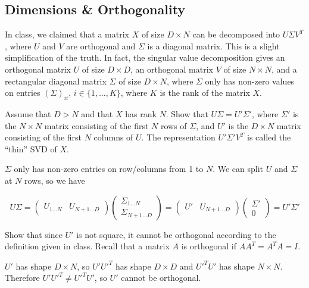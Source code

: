 \subsection{Dimensions \& Orthogonality} In class, we claimed that a matrix $X$ of size $D \times N$ can be decomposed into $U\Sigma V^T$, where $U$ and $V$ are orthogonal and $\Sigma$ is a diagonal matrix. This is a slight simplification of the truth. In fact, the singular value decomposition gives an orthogonal matrix $U$ of size $D \times D$, an orthogonal matrix $V$ of size $N \times N$, and a rectangular diagonal matrix $\Sigma$ of size $D \times N$, where $\Sigma$ only has non-zero values on entries $(\Sigma)_{ii}$, $i \in \{1, \ldots, K\}$, where $K$ is the rank of the matrix $X$. 

\problem[3]Assume that $D > N$ and that $X$ has rank $N$. Show that $U\Sigma = U'\Sigma'$, where $\Sigma'$ is the $N \times N$ matrix consisting of the first $N$ rows of $\Sigma$, and $U'$ is the $D \times N$ matrix consisting of the first $N$ columns of $U$. The representation $U'\Sigma' V^T$ is called the ``thin'' SVD of $X$.

\begin{solution}
	$\Sigma$ only has non-zero entries on row/columns from 1 to $N$.
	We can split $U$ and $\Sigma$ at $N$ rows, so we have

	$$
	U \Sigma = 
	\begin{pmatrix}
		U_{1 \dots N} & U_{N+1 \dots D}
	\end{pmatrix}
	\begin{pmatrix}
		\Sigma_{1 \dots N} \\
		\Sigma_{N+1 \dots D}
	\end{pmatrix} =
	\begin{pmatrix}
		U' & U_{N+1 \dots D}
	\end{pmatrix}
	\begin{pmatrix}
		\Sigma' \\
		0
	\end{pmatrix} =
	U' \Sigma'
	$$
\end{solution}

\problem[3] Show that since $U'$ is not square, it cannot be orthogonal according to the definition given in class. Recall that a matrix $A$ is orthogonal if $A A^T = A^T A = I$.

\begin{solution}
	$U'$ has shape $D \times N$, so $U' U'^T$ has shape $D \times D$ and $U'^T U'$ has shape $N \times N$.
	Therefore $U' U'^T \neq U'^T U'$, so $U'$ cannot be orthogonal.
\end{solution} 

